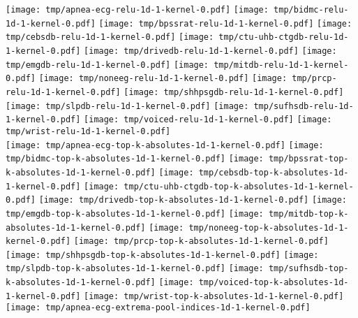 \documentclass[journal]{IEEEtran}
\begin{document}
\begin{figure*}[!t]
	\centering
	\texttt{[image: tmp/apnea-ecg-relu-1d-1-kernel-0.pdf]}
	\texttt{[image: tmp/bidmc-relu-1d-1-kernel-0.pdf]}
	\texttt{[image: tmp/bpssrat-relu-1d-1-kernel-0.pdf]}
	\texttt{[image: tmp/cebsdb-relu-1d-1-kernel-0.pdf]}
	\texttt{[image: tmp/ctu-uhb-ctgdb-relu-1d-1-kernel-0.pdf]}
	\texttt{[image: tmp/drivedb-relu-1d-1-kernel-0.pdf]}
	\texttt{[image: tmp/emgdb-relu-1d-1-kernel-0.pdf]}
	\texttt{[image: tmp/mitdb-relu-1d-1-kernel-0.pdf]}
	\texttt{[image: tmp/noneeg-relu-1d-1-kernel-0.pdf]}
	\texttt{[image: tmp/prcp-relu-1d-1-kernel-0.pdf]}
	\texttt{[image: tmp/shhpsgdb-relu-1d-1-kernel-0.pdf]}
	\texttt{[image: tmp/slpdb-relu-1d-1-kernel-0.pdf]}
	\texttt{[image: tmp/sufhsdb-relu-1d-1-kernel-0.pdf]}
	\texttt{[image: tmp/voiced-relu-1d-1-kernel-0.pdf]}
	\texttt{[image: tmp/wrist-relu-1d-1-kernel-0.pdf]}
	\\
	\texttt{[image: tmp/apnea-ecg-top-k-absolutes-1d-1-kernel-0.pdf]}
	\texttt{[image: tmp/bidmc-top-k-absolutes-1d-1-kernel-0.pdf]}
	\texttt{[image: tmp/bpssrat-top-k-absolutes-1d-1-kernel-0.pdf]}
	\texttt{[image: tmp/cebsdb-top-k-absolutes-1d-1-kernel-0.pdf]}
	\texttt{[image: tmp/ctu-uhb-ctgdb-top-k-absolutes-1d-1-kernel-0.pdf]}
	\texttt{[image: tmp/drivedb-top-k-absolutes-1d-1-kernel-0.pdf]}
	\texttt{[image: tmp/emgdb-top-k-absolutes-1d-1-kernel-0.pdf]}
	\texttt{[image: tmp/mitdb-top-k-absolutes-1d-1-kernel-0.pdf]}
	\texttt{[image: tmp/noneeg-top-k-absolutes-1d-1-kernel-0.pdf]}
	\texttt{[image: tmp/prcp-top-k-absolutes-1d-1-kernel-0.pdf]}
	\texttt{[image: tmp/shhpsgdb-top-k-absolutes-1d-1-kernel-0.pdf]}
	\texttt{[image: tmp/slpdb-top-k-absolutes-1d-1-kernel-0.pdf]}
	\texttt{[image: tmp/sufhsdb-top-k-absolutes-1d-1-kernel-0.pdf]}
	\texttt{[image: tmp/voiced-top-k-absolutes-1d-1-kernel-0.pdf]}
	\texttt{[image: tmp/wrist-top-k-absolutes-1d-1-kernel-0.pdf]}
	\\
	\texttt{[image: tmp/apnea-ecg-extrema-pool-indices-1d-1-kernel-0.pdf]}

\end{figure*}
\end{document}
